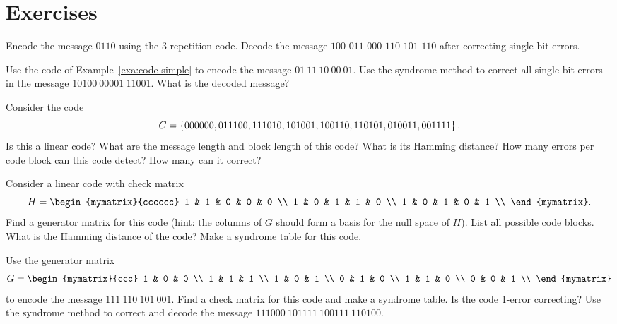 \section*{Exercises}

\begin{ex}
  Encode the message $0110$ using the 3-repetition code.  Decode the
  message $100$ $011$ $000$ $110$ $101$ $110$ after correcting single-bit
  errors.
\end{ex}

\begin{ex}
  Use the code of Example~\ref{exa:code-simple} to encode the message
  $01~11~10~00~01$. Use the syndrome method to correct all single-bit
  errors in the message $10100~00001~11001$. What is the decoded message?
\end{ex}

\begin{ex}
  Consider the code
  \begin{equation*}
    C=\left\{000000,011100,111010,101001,100110,110101,010011,001111\right\}.
  \end{equation*}
  Is this a linear code? What are the message length and block length
  of this code?  What is its Hamming distance? How many errors per
  code block can this code detect? How many can it correct?
\end{ex}

\begin{ex}
  Consider a linear code with check matrix
  \begin{equation*}
    H = \begin{mymatrix}{cccccc}
      1 & 1 & 0 & 0 & 0 \\
      1 & 0 & 1 & 1 & 0 \\
      1 & 0 & 1 & 0 & 1 \\
    \end{mymatrix}.
  \end{equation*}
  Find a generator matrix for this code (hint: the columns of $G$
  should form a basis for the null space of $H$). List all possible
  code blocks. What is the Hamming distance of the code? Make a
  syndrome table for this code.
\end{ex}

\begin{ex}
  Use the generator matrix
  \begin{equation*}
    G = \begin{mymatrix}{ccc}
      1 & 0 & 0 \\
      1 & 1 & 1 \\
      1 & 0 & 1 \\
      0 & 1 & 0 \\
      1 & 1 & 0 \\
      0 & 0 & 1 \\
    \end{mymatrix}
  \end{equation*}
  to encode the message $111~110~101~001$. Find a check matrix for
  this code and make a syndrome table. Is the code 1-error correcting?
  Use the syndrome method to correct and decode the message
  $111000~101111~100111~110100$.
\end{ex}

